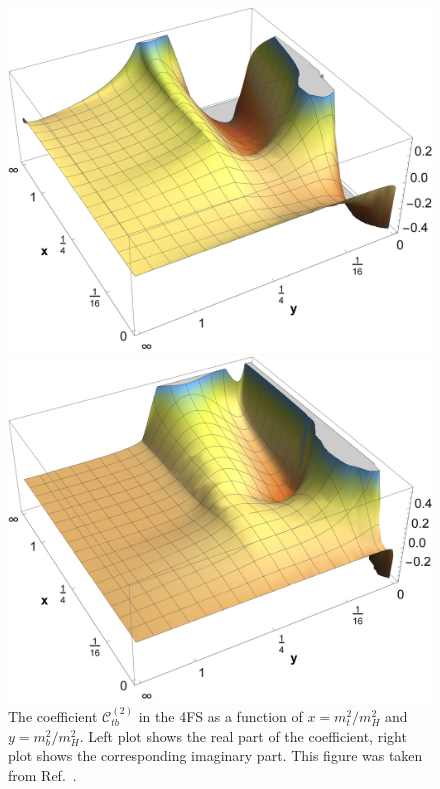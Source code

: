 \begin{figure}[ht]
\begin{minipage}{0.48\textwidth}
\centering
\includegraphics[width=\textwidth]{Images/ggH-tb_Re.pdf}
\end{minipage}
\begin{minipage}{0.48\textwidth}
\centering
\includegraphics[width=\textwidth]{Images/ggH-tb_Im.pdf}
\end{minipage}
\caption{The coefficient $\mathcal{C}_{tb}^{(2)}$ in the 4\acs{FS} as a function of $x = m_t^2/m_H^2$ and $y = m_b^2/m_H^2$. Left plot shows the real part of the coefficient, right plot shows the corresponding imaginary part. This figure was taken from Ref.~\cite{Niggetiedt:2024nmp}.}
\label{fig:5:Ctb}
\end{figure}
